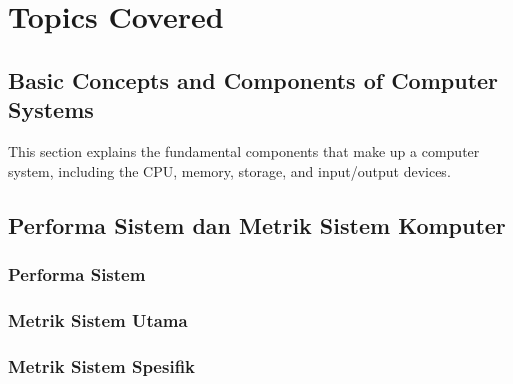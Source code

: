 \documentclass[12pt]{article}
\begin{document}
\section{Topics Covered}

\subsection{Basic Concepts and Components of Computer Systems}
This section explains the fundamental components that make up a computer system, including the CPU, memory, storage, and input/output devices.

\subsection{Performa Sistem dan Metrik Sistem Komputer}
\subsubsection{Performa Sistem}
\subsubsection{Metrik Sistem Utama}
\subsubsection{Metrik Sistem Spesifik}
\end{document}

